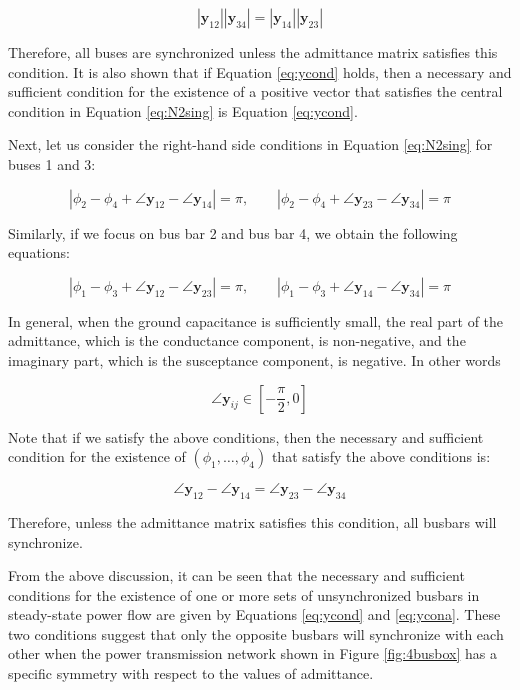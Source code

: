 \documentclass[graybox, envcountchap]{svmult}
\begin{document}
\begin{example}
\begin{equation}\label{eq:ycond}
  |\bm{y}_{12}||\bm{y}_{34}| = |\bm{y}_{14}||\bm{y}_{23}|
\end{equation}

Therefore, all buses are synchronized unless the admittance matrix satisfies
this condition. It is also shown that if Equation \ref{eq:ycond} holds, then a
necessary and sufficient condition for the existence of a positive vector that
satisfies the central condition in Equation \ref{eq:N2sing}  is Equation
\ref{eq:ycond}.

Next, let us consider the right-hand side conditions in Equation \ref{eq:N2sing}
for buses 1 and 3:

\begin{equation*}
  |\phi_2 - \phi_4 + \angle \bm{y}_{12} - \angle \bm{y}_{14}|=\pi
  ,\qquad
  |\phi_2 - \phi_4 + \angle \bm{y}_{23} - \angle \bm{y}_{34}|=\pi
\end{equation*}

Similarly, if we focus on bus bar 2 and bus bar 4, we obtain the following
equations:

\begin{equation*}
  |\phi_1 - \phi_3 + \angle \bm{y}_{12} - \angle \bm{y}_{23}|=\pi
  ,\qquad
  |\phi_1 - \phi_3 + \angle \bm{y}_{14} - \angle \bm{y}_{34}|=\pi
\end{equation*}

In general, when the ground capacitance is sufficiently small, the real part of
the admittance, which is the conductance component, is non-negative, and the
imaginary part, which is the susceptance component, is negative. In other words

\[
  \angle \bm{y}_{ij} \in \left[-\frac{\pi}{2},0 \right]
\]

Note that if we satisfy the above conditions, then the necessary and sufficient
condition for the existence of $(\phi_1,\ldots,\phi_4)$ that satisfy the above
conditions is:

\begin{equation}\label{eq:ycona}
  \angle \bm{y}_{12} - \angle \bm{y}_{14}=
  \angle \bm{y}_{23} - \angle \bm{y}_{34}
\end{equation}

Therefore, unless the admittance matrix satisfies this condition, all busbars
will synchronize.

From the above discussion, it can be seen that the necessary and sufficient
conditions for the existence of one or more sets of unsynchronized busbars in
steady-state power flow are given by Equations \ref{eq:ycond} and
\ref{eq:ycona}. These two conditions suggest that only the opposite busbars will
synchronize with each other when the power transmission network shown in Figure
\ref{fig:4busbox} has a specific symmetry with respect to the values of
admittance.
\end{example}
\end{document}

